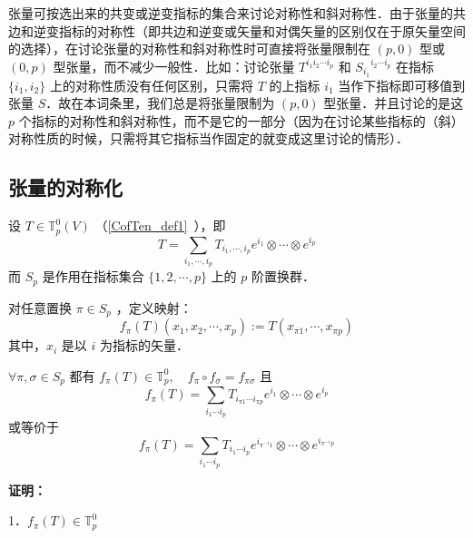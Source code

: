 
\begin{issues}
\issueTODO
\end{issues}

张量可按选出来的共变或逆变指标的集合来讨论对称性和斜对称性．由于张量的共边和逆变指标的对称性（即共边和逆变或矢量和对偶矢量的区别仅在于原矢量空间的选择），在讨论张量的对称性和斜对称性时可直接将张量限制在 $(p,0)$ 型或 $(0,p)$ 型张量，而不减少一般性．比如：讨论张量 $T^{i_1 i_2\cdots i_p}$ 和 ${S_{i_1}}^{i_2\cdots i_p}$ 在指标 $\{i_1,i_2\}$ 上的对称性质没有任何区别，只需将 $T$ 的上指标 $i_1$ 当作下指标即可移值到张量 $S$．故在本词条里，我们总是将张量限制为 $(p,0)$ 型张量．并且讨论的是这 $p$ 个指标的对称性和斜对称性，而不是它的一部分（因为在讨论某些指标的（斜）对称性质的时候，只需将其它指标当作固定的就变成这里讨论的情形）．
\subsection{张量的对称化}
设 $T\in \mathbb{T}_p^0(V)$ （\autoref{CofTen_def1}~），即
\begin{equation}
T=\sum_{i_1,\cdots,i_p}T_{i_1,\cdots,i_p}e^{i_1}\otimes\cdots\otimes e^{i_p}
\end{equation}
而 $S_p$ 是作用在指标集合 $\{1,2,\cdots,p\}$ 上的 $p$ 阶置换群．

对任意置换 $\pi\in S_p$ ，定义映射：
\begin{equation}\label{SIofTe_eq1}
f_\pi(T)(x_1,x_2,\cdots,x_p):=T(x_{\pi1},\cdots,x_{\pi p})
\end{equation}
其中，$x_i$ 是以 $i$ 为指标的矢量．

\begin{theorem}{}
$\forall \pi,\sigma\in S_p$ 都有 
$f_{\pi}(T)\in\mathbb{T}_p^0,\quad f_\pi\circ f_\sigma=f_{\pi\sigma}$ 且
\begin{equation}\label{SIofTe_eq2}
f_{\pi}(T)=\sum_{i_1\cdots i_p}T_{i_{\pi1}\cdots i_{\pi p}}e^{i_1}\otimes\cdots\otimes e^{i_p}
\end{equation}
或等价于
\begin{equation}\label{SIofTe_eq3}
f_{\pi}(T)=\sum_{i_1\cdots i_p}T_{i_1\cdots i_p}e^{i_{\pi^{-1}1}}\otimes\cdots\otimes e^{i_{\pi^{-1}p}}
\end{equation}
\end{theorem}
\textbf{证明：}

1．$f_\pi(T)\in\mathbb{T}_p^0$

